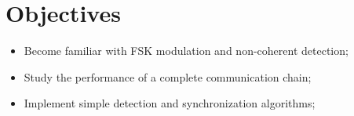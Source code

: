 \section*{Objectives}
\begin{itemize}
    \item Become familiar with FSK modulation and non-coherent detection;
    \item Study the performance of a complete communication chain;
    \item Implement simple detection and synchronization algorithms;
\end{itemize}
